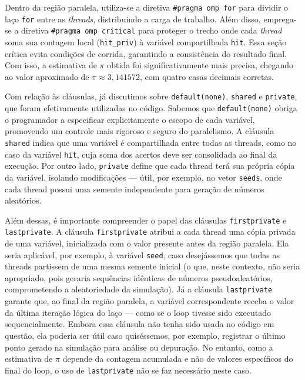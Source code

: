 \documentclass[a4paper, 12pt]{article}
\begin{document}
	\hspace{0.5cm}Dentro da região paralela, utiliza-se a diretiva \texttt{\#pragma omp for} para dividir o laço \texttt{for} entre as \textit{threads}, distribuindo a carga de trabalho. Além disso, emprega-se a diretiva \texttt{\#pragma omp critical} para proteger o trecho onde cada \textit{thread} soma sua contagem local (\texttt{hit\_priv}) à variável compartilhada \texttt{hit}. Essa seção crítica evita condições de corrida, garantindo a consistência do resultado final. Com isso, a estimativa de $\pi$ obtida foi significativamente mais precisa, chegando ao valor aproximado de $\pi \approx 3{,}141572$, com quatro casas decimais corretas.
	
	Com relação às cláusulas, já discutimos sobre \texttt{default(none)}, \texttt{shared} e \texttt{private}, que foram efetivamente utilizadas no código. Sabemos que \texttt{default(none)} obriga o programador a especificar explicitamente o escopo de cada variável, promovendo um controle mais rigoroso e seguro do paralelismo. A cláusula \texttt{shared} indica que uma variável é compartilhada entre todas as threads, como no caso da variável \texttt{hit}, cuja soma dos acertos deve ser consolidada ao final da execução. Por outro lado, \texttt{private} define que cada thread terá sua própria cópia da variável, isolando modificações — útil, por exemplo, no vetor \texttt{seeds}, onde cada thread possui uma semente independente para geração de números aleatórios.
	
	Além dessas, é importante compreender o papel das cláusulas \texttt{firstprivate} e \texttt{lastprivate}. A cláusula \texttt{firstprivate} atribui a cada thread uma cópia privada de uma variável, inicializada com o valor presente antes da região paralela. Ela seria aplicável, por exemplo, à variável \texttt{seed}, caso desejássemos que todas as threads partissem de uma mesma semente inicial (o que, neste contexto, não seria apropriado, pois geraria sequências idênticas de números pseudoaleatórios, comprometendo a aleatoriedade da simulação). Já a cláusula \texttt{lastprivate} garante que, ao final da região paralela, a variável correspondente receba o valor da última iteração lógica do laço — como se o loop tivesse sido executado sequencialmente. Embora essa cláusula não tenha sido usada no código em questão, ela poderia ser útil caso quiséssemos, por exemplo, registrar o último ponto gerado na simulação para análise ou depuração. No entanto, como a estimativa de $\pi$ depende da contagem acumulada e não de valores específicos do final do loop, o uso de \texttt{lastprivate} não se faz necessário neste caso.
	
\end{document}
